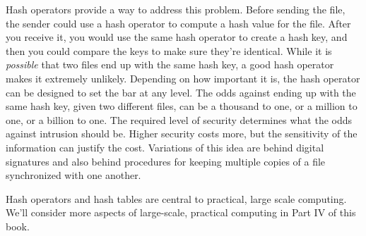 Hash operators provide a way to address this problem.
Before sending the file, the sender could use a hash operator to compute a hash
value for the file. After you receive it, you would use the same hash operator
to create a hash key, and then you could compare the keys to make sure
they're identical. While it is \emph{possible} that two files end up with the
same hash key, a good hash operator makes it extremely unlikely.
Depending on how important it is, the hash operator can be designed to set
the bar at any level. The odds against
ending up with the same hash key, given two different files, can be
a thousand to one, or a million to one, or a billion to one.
The required level of security
determines what the odds against intrusion should be. Higher security
costs more, but the sensitivity of the information can justify the cost.
Variations of this idea are behind digital signatures and
also behind procedures for
keeping multiple copies of a file synchronized with one another.

Hash operators and hash tables are central to practical, large scale computing.
We'll consider more aspects of large-scale, practical computing
in Part IV of this book.

